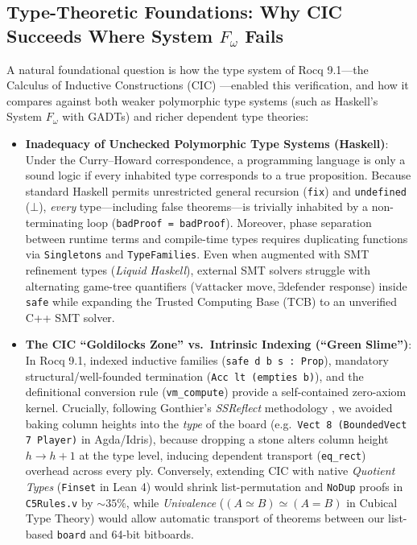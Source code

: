 \documentclass[11pt,reqno]{amsart}
\theoremstyle{plain}
\theoremstyle{definition}
\theoremstyle{remark}
\begin{document}
\subsection{Type-Theoretic Foundations: Why CIC Succeeds Where System $F_\omega$ Fails}
A natural foundational question is how the type system of Rocq 9.1---the Calculus of Inductive Constructions (CIC) \cite{coquand1988calculus}---enabled this verification, and how it compares against both weaker polymorphic type systems (such as Haskell's System $F_\omega$ with GADTs) and richer dependent type theories:
\begin{itemize}
    \item \textbf{Inadequacy of Unchecked Polymorphic Type Systems (Haskell)}: Under the Curry--Howard correspondence, a programming language is only a sound logic if every inhabited type corresponds to a true proposition. Because standard Haskell permits unrestricted general recursion (\texttt{fix}) and \texttt{undefined} ($\bot$), \emph{every} type---including false theorems---is trivially inhabited by a non-terminating loop (\texttt{badProof = badProof}). Moreover, phase separation between runtime terms and compile-time types requires duplicating functions via \texttt{Singletons} and \texttt{TypeFamilies}. Even when augmented with SMT refinement types (\emph{Liquid Haskell}), external SMT solvers struggle with alternating game-tree quantifiers ($\forall \text{attacker move}, \exists \text{defender response}$) inside \texttt{safe} while expanding the Trusted Computing Base (TCB) to an unverified C++ SMT solver.
    \item \textbf{The CIC ``Goldilocks Zone'' vs.\ Intrinsic Indexing (``Green Slime'')}: In Rocq 9.1, indexed inductive families (\texttt{safe d b s : Prop}), mandatory structural/well-founded termination (\texttt{Acc lt (empties b)}), and the definitional conversion rule (\texttt{vm\_compute}) provide a self-contained zero-axiom kernel. Crucially, following Gonthier's \emph{SSReflect} methodology \cite{gonthier2008formal}, we avoided baking column heights into the \emph{type} of the board (e.g.\ \texttt{Vect 8 (BoundedVect 7 Player)} in Agda/Idris), because dropping a stone alters column height $h \to h+1$ at the type level, inducing dependent transport (\texttt{eq\_rect}) overhead across every ply. Conversely, extending CIC with native \emph{Quotient Types} (\texttt{Finset} in Lean 4) would shrink list-permutation and \texttt{NoDup} proofs in \texttt{C5Rules.v} by $\sim 35\%$, while \emph{Univalence} ($(A \simeq B) \simeq (A = B)$ in Cubical Type Theory) would allow automatic transport of theorems between our list-based \texttt{board} and 64-bit bitboards.
\end{itemize}
\end{document}
